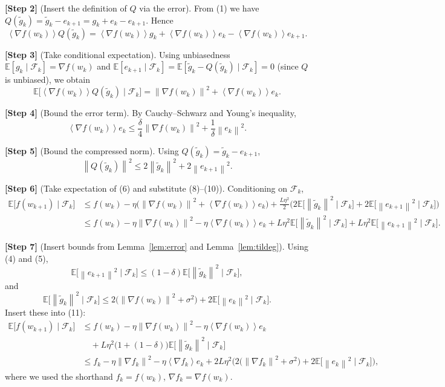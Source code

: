 \documentclass[11pt]{article}
\newcommand{\E}{\mathbb{E}}
\newcommand{\norm}[1]{\left\|#1\right\|}
\newcommand{\inner}[1]{\left\langle #1 \right\rangle}
\begin{document}
\noindent\textbf{[Step 2]} (Insert the definition of $Q$ via the error). From (1) we have $Q(\tilde g_{k})=\tilde g_{k}-e_{k+1}=g_{k}+e_{k}-e_{k+1}$. Hence
\[
\inner{\nabla f(w_{k})}{Q(\tilde g_{k})}
= \inner{\nabla f(w_{k})}{g_{k}}+\inner{\nabla f(w_{k})}{e_{k}}-\inner{\nabla f(w_{k})}{e_{k+1}}. \tag{7}
\]

\noindent\textbf{[Step 3]} (Take conditional expectation). Using unbiasedness $\E[g_{k}\mid\mathcal{F}_{k}]=\nabla f(w_{k})$ and $\E[e_{k+1}\mid\mathcal{F}_{k}]=\E[\tilde g_{k}-Q(\tilde g_{k})\mid\mathcal{F}_{k}]=0$ (since $Q$ is unbiased), we obtain
\[
\E\!\big[\inner{\nabla f(w_{k})}{Q(\tilde g_{k})}\mid\mathcal{F}_{k}\big]
= \norm{\nabla f(w_{k})}^{2}+\inner{\nabla f(w_{k})}{e_{k}}. \tag{8}
\]

\noindent\textbf{[Step 4]} (Bound the error term). By Cauchy–Schwarz and Young’s inequality,
\[
\inner{\nabla f(w_{k})}{e_{k}}
\le \frac{\delta}{4}\norm{\nabla f(w_{k})}^{2}
+\frac{1}{\delta}\norm{e_{k}}^{2}. \tag{9}
\]

\noindent\textbf{[Step 5]} (Bound the compressed norm). Using $Q(\tilde g_{k})=\tilde g_{k}-e_{k+1}$,
\[
\norm{Q(\tilde g_{k})}^{2}
\le 2\norm{\tilde g_{k}}^{2}+2\norm{e_{k+1}}^{2}. \tag{10}
\]

\noindent\textbf{[Step 6]} (Take expectation of (6) and substitute (8)–(10)). Conditioning on $\mathcal{F}_{k}$,
\[
\begin{aligned}
\E\!\big[f(w_{k+1})\mid\mathcal{F}_{k}\big]
&\le f(w_{k})-\eta\Big(\norm{\nabla f(w_{k})}^{2}
+\inner{\nabla f(w_{k})}{e_{k}}\Big)
+\frac{L\eta^{2}}{2}\Big(2\E\!\big[\norm{\tilde g_{k}}^{2}\mid\mathcal{F}_{k}\big]
+2\E\!\big[\norm{e_{k+1}}^{2}\mid\mathcal{F}_{k}\big]\Big)\\[4pt]
&\le f(w_{k})-\eta\norm{\nabla f(w_{k})}^{2}
-\eta\inner{\nabla f(w_{k})}{e_{k}}
+L\eta^{2}\E\!\big[\norm{\tilde g_{k}}^{2}\mid\mathcal{F}_{k}\big]
+L\eta^{2}\E\!\big[\norm{e_{k+1}}^{2}\mid\mathcal{F}_{k}\big].
\end{aligned}
\tag{11}
\]

\noindent\textbf{[Step 7]} (Insert bounds from Lemma~\ref{lem:error} and Lemma~\ref{lem:tildeg}).  
Using (4) and (5),
\[
\E\!\big[\norm{e_{k+1}}^{2}\mid\mathcal{F}_{k}\big]\le (1-\delta)\E\!\big[\norm{\tilde g_{k}}^{2}\mid\mathcal{F}_{k}\big],
\]
and
\[
\E\!\big[\norm{\tilde g_{k}}^{2}\mid\mathcal{F}_{k}\big]
\le 2\big(\norm{\nabla f(w_{k})}^{2}+\sigma^{2}\big)+2\E\!\big[\norm{e_{k}}^{2}\mid\mathcal{F}_{k}\big].
\tag{12}
\]
Insert these into (11):
\[
\begin{aligned}
\E\!\big[f(w_{k+1})\mid\mathcal{F}_{k}\big]
&\le f(w_{k})-\eta\norm{\nabla f(w_{k})}^{2}
-\eta\inner{\nabla f(w_{k})}{e_{k}}\\
&\quad+L\eta^{2}\Big(1+(1-\delta)\Big)\E\!\big[\norm{\tilde g_{k}}^{2}\mid\mathcal{F}_{k}\big]\\
&\le f_{k}
-\eta\norm{\nabla f_{k}}^{2}
-\eta\inner{\nabla f_{k}}{e_{k}}
+2L\eta^{2}\Big(2\big(\norm{\nabla f_{k}}^{2}+\sigma^{2}\big)
+2\E\!\big[\norm{e_{k}}^{2}\mid\mathcal{F}_{k}\big]\Big),
\end{aligned}
\tag{13}
\]
where we used the shorthand $f_{k}=f(w_{k})$, $\nabla f_{k}=\nabla f(w_{k})$.
\end{document}
